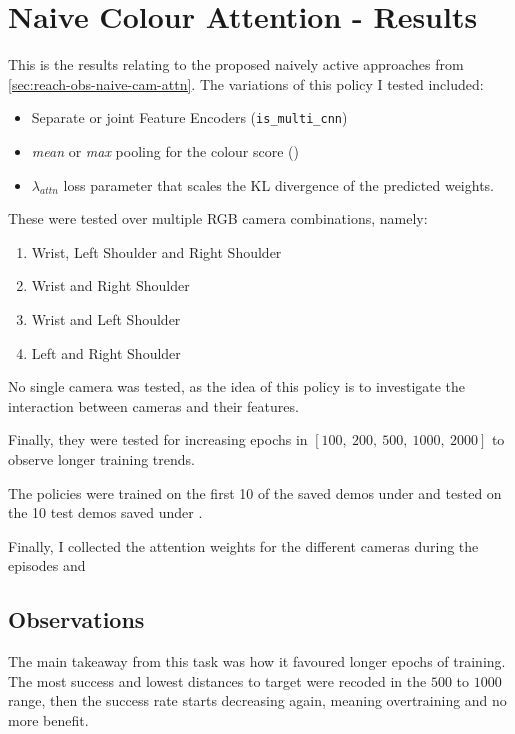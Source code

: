 \section{Naive Colour Attention - Results}
This is the results relating to the proposed naively active approaches from \ref{sec:reach-obs-naive-cam-attn}.
The variations of this policy I tested included: 
\begin{itemize}
  \item Separate or joint Feature Encoders (\verb|is_multi_cnn|)
  \item \emph{mean} or \emph{max} pooling for the colour score (\verb||)
  \item $\lambda_{attn}$ loss parameter that scales the KL divergence of the predicted 
  weights.
\end{itemize}
These were tested over multiple RGB camera combinations, namely:
\begin{enumerate}
  \item Wrist, Left Shoulder and Right Shoulder
  \item Wrist and Right Shoulder
  \item Wrist and Left Shoulder
  \item Left and Right Shoulder
\end{enumerate}
No single camera was tested, as the idea of this policy is to investigate the interaction between cameras and their features.

Finally, they were tested for increasing epochs in \(\left[100, ~200, ~500, ~1000, ~2000\right]\) to observe longer training trends.

The policies were trained on the first 10 of the saved demos under  and tested on the 10 test demos saved under .

Finally, I collected the attention weights for the different cameras during the episodes and 

\subsection{Observations}
The main takeaway from this task was how it favoured longer epochs of training. The most success and lowest distances to target were recoded in the $500$ to $1000$ range, then the success rate starts decreasing again, meaning overtraining and no more benefit.\todo[color=purple]{}

